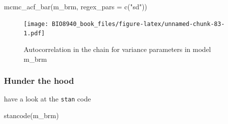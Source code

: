 \documentclass[
  12pt,
]{book}
\newenvironment{Shaded}{\begin{snugshade}}{\end{snugshade}}
\newcommand{\AttributeTok}[1]{\textcolor[rgb]{0.77,0.63,0.00}{#1}}
\newcommand{\FunctionTok}[1]{\textcolor[rgb]{0.00,0.00,0.00}{#1}}
\newcommand{\NormalTok}[1]{#1}
\newcommand{\StringTok}[1]{\textcolor[rgb]{0.31,0.60,0.02}{#1}}
\begin{document}
\begin{Shaded}
\begin{Highlighting}[]
\FunctionTok{mcmc\_acf\_bar}\NormalTok{(m\_brm, }\AttributeTok{regex\_pars =} \FunctionTok{c}\NormalTok{(}\StringTok{"sd"}\NormalTok{))}
\end{Highlighting}
\end{Shaded}

\begin{figure}
\centering
\texttt{[image: BIO8940\_book\_files/figure-latex/unnamed-chunk-83-1.pdf]}
\caption{\label{fig:unnamed-chunk-83}Autocorrelation in the chain for variance parameters in model m\_brm}
\end{figure}

\hypertarget{hunder-the-hood}{%
\subsubsection{Hunder the hood}\label{hunder-the-hood}}

have a look at the \texttt{stan} code

\begin{Shaded}
\begin{Highlighting}[]
\FunctionTok{stancode}\NormalTok{(m\_brm)}
\end{Highlighting}
\end{Shaded}
\end{document}
